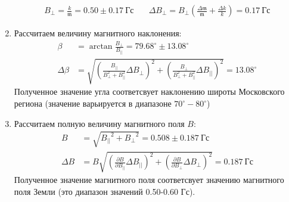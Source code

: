 \documentclass[a4paper, 10pt]{article}
\begin{document}
\begin{enumerate}
    \begin{align*}
        B_{\perp} = \frac{k}{\mathfrak{m}} = 0.50\pm 0.17\ \text{Гс} & \quad \Delta B_{\perp} = B_{\perp}\left(\frac{\Delta \mathfrak{m}}{\mathfrak{m}} + \frac{\Delta k}{k}\right) = 0.17\ \text{Гс}
    \end{align*}
    \item Рассчитаем величину магнитного наклонения:
    \begin{align*}
        \beta & = \arctan{\frac{{B_{\perp}}}{{B_{||}}}} = 79{.}68^\circ \pm 13{.}08^{\circ}\\
        \Delta \beta & = \sqrt{\left(\frac{B_{||}}{B_{\perp}^2 + B_{||}^2}\Delta B_{\perp}\right)^2 + \left(\frac{B_{\perp}}{B_{\perp}^2 + B_{||}^2}\Delta B_{||}\right)^2} = 13{.}08^{\circ}
    \end{align*}
    Полученное значение угла соответсвует наклонению широты Московского региона (значение варьируется в диапазоне $70^{\circ}-80^{\circ}$)
    \item Рассчитаем полную величину магнитного поля ${B}$:
    \begin{align*}
        {B} & = \sqrt{{B_{||}}^{2} + {B_{\perp}}^{2}} = 0.508\pm 0.187\ \text{Гс}\\
        \Delta {B} & = {B}\sqrt{\left(\frac{\partial {B}}{\partial {B_{||}}}\Delta {B_{||}}\right)^{2} + \left(\frac{\partial {B}}{\partial {B_{\perp}}}\Delta {B_{\perp}}\right)^{2}} = 0.187\ \text{Гс}
    \end{align*}
    Полученное значение магнитного поля соответсвует значению магнитного поля Земли (это диапазон значений 0.50-0.60 Гс).
\end{enumerate}
\end{document}

